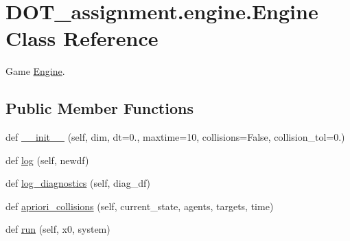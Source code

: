 \hypertarget{class_d_o_t__assignment_1_1engine_1_1_engine}{}\section{D\+O\+T\+\_\+assignment.\+engine.\+Engine Class Reference}
\label{class_d_o_t__assignment_1_1engine_1_1_engine}


Game \mbox{\hyperlink{class_d_o_t__assignment_1_1engine_1_1_engine}{Engine}}.  


\subsection*{Public Member Functions}
\begin{DoxyCompactItemize}
\item 
def \mbox{\hyperlink{class_d_o_t__assignment_1_1engine_1_1_engine_a015280d12f0cd3f5bf517dd662383474}{\+\_\+\+\_\+init\+\_\+\+\_\+}} (self, dim, dt=0., maxtime=10, collisions=False, collision\+\_\+tol=0.)
\item 
def \mbox{\hyperlink{class_d_o_t__assignment_1_1engine_1_1_engine_a982ebd173ac561463636cb188056eda4}{log}} (self, newdf)
\item 
def \mbox{\hyperlink{class_d_o_t__assignment_1_1engine_1_1_engine_a683369c41802adb71bc6fcf1c60a6439}{log\+\_\+diagnostics}} (self, diag\+\_\+df)
\item 
def \mbox{\hyperlink{class_d_o_t__assignment_1_1engine_1_1_engine_a965e2f0ced03f6e896b1fbb754c4d5fd}{apriori\+\_\+collisions}} (self, current\+\_\+state, agents, targets, time)
\item 
def \mbox{\hyperlink{class_d_o_t__assignment_1_1engine_1_1_engine_ae7c65ec5d3ca05e3e23de9cdf8927639}{run}} (self, x0, system)
\end{DoxyCompactItemize}
